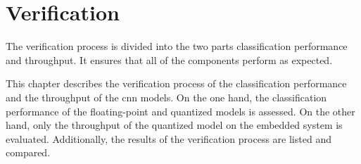 \chapter{Verification}
\label{ch:verification_and_benchmark}

The verification process is divided into the two parts classification performance and throughput.
It ensures that all of the components perform as expected.



This chapter describes the verification process of the classification performance and the throughput of the \acrshort{cnn} models.
On the one hand, the classification performance of the floating-point and quantized models is assessed.
On the other hand, only the throughput of the quantized model on the embedded system is evaluated.
Additionally, the results of the verification process are listed and compared.



